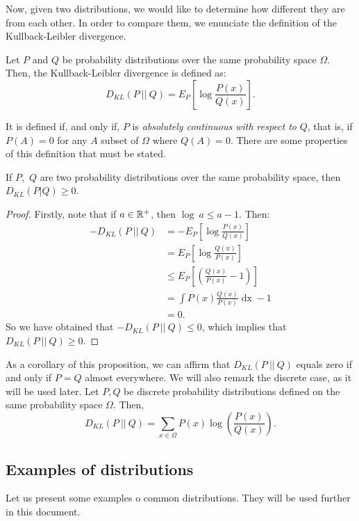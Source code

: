 Now, given two distributions, we would like to determine how different they are from each other.
In order to compare them, we enunciate the definition of the Kullback-Leibler divergence.

\begin{ndefC}
Let $P$ and $Q$ be probability distributions over the same probability space $\Omega$. Then, the Kullback-Leibler divergence is defined as:
$$
D_{KL}(P \ || \ Q) = E_P\left[\log{\frac{P(x)}{Q(x)}}\right].
$$
\end{ndefC}
It is defined if, and only if, $P$ is \emph{absolutely continuous with respect to} $Q$, that is, if $P(A) = 0$ for any $A$ subset of $\Omega$ where $Q(A) = 0$.
 There are some properties of this definition that must be stated. 

\begin{nprop}
If $P,$ $Q$ are two probability distributions over the same probability space, then $D_{KL}(P|Q) \geq 0$.
\end{nprop}
\begin{proof}
Firstly, note that if $a \in \mathbb{R}^+$, then $\log \ a \leq a-1$. Then:
\begin{align*}
-D_{KL}(P \ || \ Q) & = - E_P\left[\log{\frac{P(x)}{Q(x)}}\right] \\
             & = E_P\left[\log{\frac{Q(x)}{P(x)}}\right] \\
             & \leq E_P\left[\left(\frac{Q(x)}{P(x)} - 1\right)\right]\\
             & = \int P(x) \frac{Q(x)}{P(x)} \mathop{dx} -1 \\
             & = 0.
\end{align*}
So we have obtained that $-D_{KL}(P\ ||\ Q) \leq 0$, which implies that $D_{KL}(P\ || \ Q) \geq 0$.
\end{proof}
As a corollary of this proposition, we can affirm that $D_{KL}(P\ ||\ Q)$ equals zero if and only if $P = Q$ almost everywhere. 
We will also remark the discrete case, as it will be used later. Let $P,Q$ be discrete probability distributions defined on the same probability space $\Omega$. Then, 
$$
D_{KL}(P\ ||\ Q) = \sum_{x \in \Omega} P(x) \log \left( \frac{P(x)}{Q(x)}\right).
$$

\subsection*{Examples of distributions}

Let us present some examples o common distributions. They will be used further in this document.

